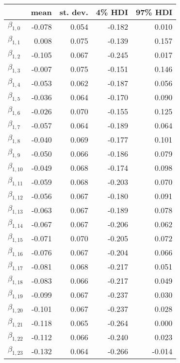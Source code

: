 \begin{tabular}{lrrrr}
\toprule
{} &   mean &  st. dev. &  4\% HDI &  97\% HDI \\
\midrule
$\beta_{1,0}$  & -0.078 &     0.054 &   -0.182 &     0.010 \\
$\beta_{1,1}$  &  0.008 &     0.075 &   -0.139 &     0.157 \\
$\beta_{1,2}$  & -0.105 &     0.067 &   -0.245 &     0.017 \\
$\beta_{1,3}$  & -0.007 &     0.075 &   -0.151 &     0.146 \\
$\beta_{1,4}$  & -0.053 &     0.062 &   -0.187 &     0.056 \\
$\beta_{1,5}$  & -0.036 &     0.064 &   -0.170 &     0.090 \\
$\beta_{1,6}$  & -0.026 &     0.070 &   -0.155 &     0.125 \\
$\beta_{1,7}$  & -0.057 &     0.064 &   -0.189 &     0.064 \\
$\beta_{1,8}$  & -0.040 &     0.069 &   -0.177 &     0.101 \\
$\beta_{1,9}$  & -0.050 &     0.066 &   -0.186 &     0.079 \\
$\beta_{1,10}$ & -0.049 &     0.068 &   -0.174 &     0.098 \\
$\beta_{1,11}$ & -0.059 &     0.068 &   -0.203 &     0.070 \\
$\beta_{1,12}$ & -0.056 &     0.067 &   -0.180 &     0.091 \\
$\beta_{1,13}$ & -0.063 &     0.067 &   -0.189 &     0.078 \\
$\beta_{1,14}$ & -0.067 &     0.067 &   -0.206 &     0.062 \\
$\beta_{1,15}$ & -0.071 &     0.070 &   -0.205 &     0.072 \\
$\beta_{1,16}$ & -0.076 &     0.067 &   -0.204 &     0.066 \\
$\beta_{1,17}$ & -0.081 &     0.068 &   -0.217 &     0.051 \\
$\beta_{1,18}$ & -0.083 &     0.066 &   -0.217 &     0.049 \\
$\beta_{1,19}$ & -0.099 &     0.067 &   -0.237 &     0.030 \\
$\beta_{1,20}$ & -0.101 &     0.067 &   -0.237 &     0.028 \\
$\beta_{1,21}$ & -0.118 &     0.065 &   -0.264 &     0.000 \\
$\beta_{1,22}$ & -0.112 &     0.066 &   -0.240 &     0.023 \\
$\beta_{1,23}$ & -0.132 &     0.064 &   -0.266 &    -0.014 \\

\end{tabular}
